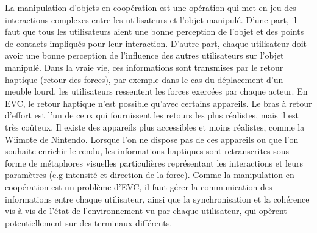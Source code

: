 \documentclass[11pt]{article}
\begin{document}
La manipulation d'objets en coopération est une opération qui met en jeu des interactions complexes entre les utilisateurs et l'objet manipulé. D'une part, il faut que tous les utilisateurs aient une bonne perception de l'objet et des points de contacts impliqués pour leur interaction. D'autre part, chaque utilisateur doit avoir une bonne perception de l'influence des autres utilisateurs sur l'objet manipulé. Dans la vraie vie, ces informations sont transmises par le retour haptique (retour des forces), par exemple dans le cas du déplacement d'un meuble lourd, les utilisateurs ressentent les forces exercées par chaque acteur. En EVC, le retour haptique n'est possible qu'avec certains appareils. Le bras à retour d'effort est l'un de ceux qui fournissent les retours les plus réalistes, mais il est très coûteux. Il existe des appareils plus accessibles et moins réalistes, comme la Wiimote de Nintendo. Lorsque l'on ne dispose pas de ces appareils ou que l'on souhaite enrichir le rendu, les informations haptiques sont retranscrites sous forme de métaphores visuelles particulières représentant les interactions et leurs paramètres (e.g intensité et direction de la force). Comme la manipulation en coopération est un problème d'EVC, il faut gérer la communication des informations entre chaque utilisateur, ainsi que la synchronisation et la cohérence vis-à-vis de l'état de l'environnement vu par chaque utilisateur, qui opèrent potentiellement sur des terminaux différents.
\end{document}

